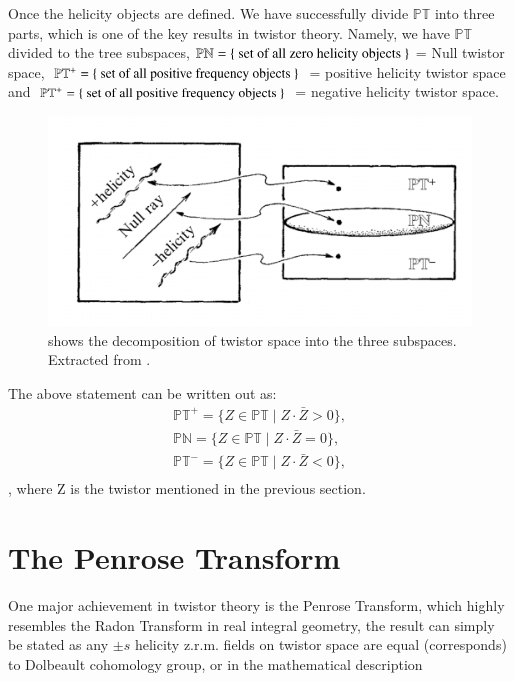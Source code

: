 \documentclass{article}
\begin{document}
  Once the helicity objects are defined. We have successfully divide
  $\mathbb{PT}$ into three parts, which is one of the key results in twistor
  theory. Namely, we have $\mathbb{PT}$ divided to the tree subspaces,
  $\mathbb{PN} = \{\textnormal{ set of all zero helicity objects }\}$ =
 Null twistor space,
  $\mathbb{PT^+} = \{ \textnormal{ set of all positive frequency objects }
  \}$ = positive helicity twistor space and 
  $\mathbb{PT^+} = \{ \textnormal{ set of all positive frequency objects }
  \}$ = negative helicity twistor space. 
\begin{figure}[h!]
\begin{center}
  \includegraphics[scale=0.5]{Figures/twistorspace.png}
\end{center}
\caption{shows the decomposition of twistor space into the three subspaces.
  Extracted from \cite{road}.}
\label{fig: twistor space decomposition}
\end{figure}
The above statement can be written out as: 
\begin{align}
  \label{twistor space decomposition}
  \mathbb{PT}^+ = \{ Z \in \mathbb{PT} \mid Z \cdot \bar Z > 0 \},\\ 
  \mathbb{PN} = \{ Z \in \mathbb{PT} \mid Z \cdot \bar Z = 0 \},\\ 
  \mathbb{PT}^- = \{ Z \in \mathbb{PT} \mid Z \cdot \bar Z < 0 \},\\ 
\end{align},
where Z is the twistor mentioned in the previous section.

 \section{The Penrose Transform}%
  \label{sec: The Penrose Transform}
  One major achievement in twistor theory is the Penrose Transform,
  which highly resembles the Radon
  Transform in real integral geometry\cite{radon1986determination},
  the result can simply be stated as any $\pm s$ helicity z.r.m.
  fields on twistor space are equal (corresponds) to  Dolbeault cohomology
  group, or in the mathematical description 
\end{document}
